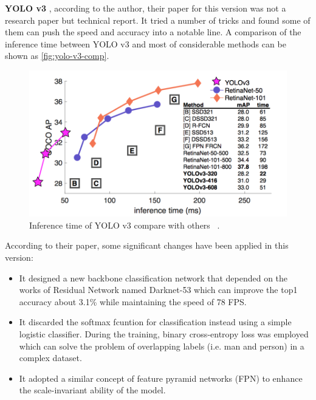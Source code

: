 \textbf{YOLO v3} \cite{yolov3-paper-2018}, according to the author, their paper
for this version was not a research paper but technical report. 
It tried a number of tricks and found some of them can push the speed and 
accuracy into a notable line.
A comparison of the inference time between YOLO v3 and most of considerable 
methods can be shown as \autoref{fig:yolo-v3-comp}.

\begin{figure}
    \begin{center}
        \includegraphics[scale=0.7]{figures/yolov3_comp.png}
    \end{center}
    \caption{Inference time of YOLO v3 compare with others
    ~\protect\cite{focal-loss-for-dense-od}.}
    \label{fig:yolo-v3-comp}
\end{figure}

According to their paper, some significant changes have been applied in this
version:

\begin{itemize}
    \item It designed a new backbone classification network that depended on the
    works of Residual Network \cite{resnet-paper1-2015}
    \cite{resnet-paper2-2016} named Darknet-53 which can improve the top1
    accuracy about 3.1\% while maintaining the speed of 78 FPS.

    \item It discarded the softmax fcuntion for classification instead using a 
    simple logistic classifier. 
    During the training, binary cross-entropy loss was
    employed which can solve the problem of overlapping labels (i.e. man and
    person) in a complex dataset.

    \item It adopted a similar concept of feature pyramid networks (FPN) to
    enhance the scale-invariant ability of the model.
\end{itemize}

